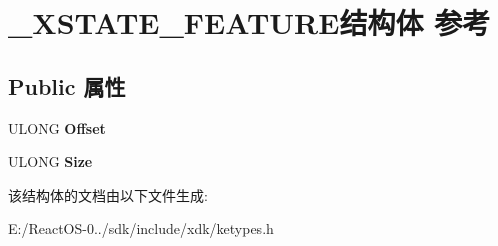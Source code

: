 \hypertarget{struct___x_s_t_a_t_e___f_e_a_t_u_r_e}{}\section{\+\_\+\+X\+S\+T\+A\+T\+E\+\_\+\+F\+E\+A\+T\+U\+R\+E结构体 参考}
\label{struct___x_s_t_a_t_e___f_e_a_t_u_r_e}
\subsection*{Public 属性}
\begin{DoxyCompactItemize}
\item 
\mbox{\label{struct___x_s_t_a_t_e___f_e_a_t_u_r_e_ab9a734a32d6dd5c385ab8dd5ad321413}} 
U\+L\+O\+NG {\bfseries Offset}
\item 
\mbox{\label{struct___x_s_t_a_t_e___f_e_a_t_u_r_e_a4160c321ae1db8239853c770e8dff1cc}} 
U\+L\+O\+NG {\bfseries Size}
\end{DoxyCompactItemize}


该结构体的文档由以下文件生成\+:\begin{DoxyCompactItemize}
\item 
E\+:/\+React\+O\+S-\/0../sdk/include/xdk/ketypes.\+h\end{DoxyCompactItemize}
